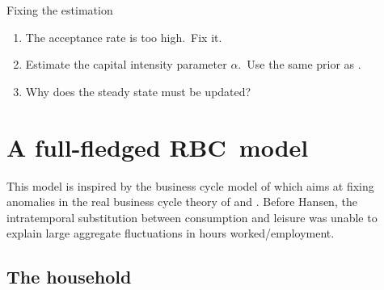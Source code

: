 \documentclass[a4paper,12pt]{article}%
\begin{document}
\begin{myexercise}{Fixing the estimation}
%


\begin{enumerate}
\item The acceptance rate is too high.\ Fix it.

\item Estimate the capital intensity parameter $\alpha$.\ Use the same prior
as \cite{smets2007shocks}.

\item Why does the steady state must be updated?
\end{enumerate}

\bigskip%
\end{myexercise}%


\section{A full-fledged RBC\ model}

This model is inspired by the business cycle model of
\cite{hansen1985indivisible} which aims at fixing anomalies in the real
business cycle theory of \cite{lucas1977understanding} and
\cite{kydland1982time}. Before Hansen, the intratemporal substitution between
consumption and leisure was unable to explain large aggregate fluctuations in
hours worked/employment.

\subsection{The household}
\end{document}
